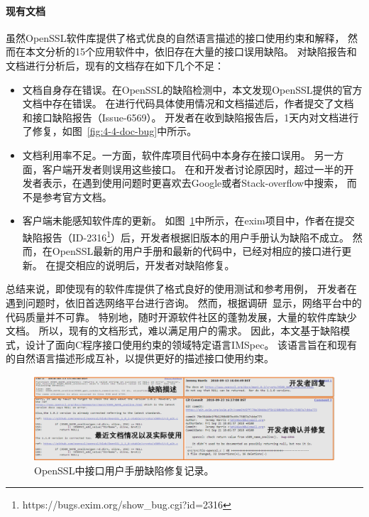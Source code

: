 \paragraph{现有文档}
虽然OpenSSL软件库提供了格式优良的自然语言描述的接口使用约束和解释，
然而在本文分析的15个应用软件中，依旧存在大量的接口误用缺陷。
对缺陷报告和文档进行分析后，现有的文档存在如下几个不足：
\begin{itemize}
	\item 文档自身存在错误。在OpenSSL的缺陷检测中，本文发现OpenSSL提供的官方文档中存在错误。
	在进行代码具体使用情况和文档描述后，作者提交了文档和接口缺陷报告（Issue-6569）。
	开发者在收到缺陷报告后，1天内对文档进行了修复，如图~\ref{fig:4-4-doc-bug}中所示。
	\item 文档利用率不足。一方面，软件库项目代码中本身存在接口误用。
	另一方面，客户端开发者则误用这些接口。
	在和开发者讨论原因时，超过一半的开发者表示，在遇到使用问题时更喜欢去Google或者Stack-overflow中搜索，
	而不是参考官方文档。
	\item 客户端未能感知软件库的更新。
	如图~\ref{fig:4-4-exim-bug}中所示，在exim项目中，作者在提交缺陷报告（ID-2316\footnote{https://bugs.exim.org/show\_bug.cgi?id=2316}）后，开发者根据旧版本的用户手册认为缺陷不成立。
	然而，在OpenSSL最新的用户手册和最新的代码中，已经对相应的接口进行更新。
	在提交相应的说明后，开发者对缺陷修复。
\end{itemize}

总结来说，即使现有的软件库提供了格式良好的使用测试和参考用例，
开发者在遇到问题时，依旧首选网络平台进行咨询。
然而，根据调研~\cite{18-icse-stack}显示，网络平台中的代码质量并不可靠。
特别地，随时开源软件社区的蓬勃发展，大量的软件库缺少文档。
所以，现有的文档形式，难以满足用户的需求。
因此，本文基于缺陷模式，设计了面向C程序接口使用约束的领域特定语言IMSpec。
该语言旨在和现有的自然语言描述形成互补，以提供更好的描述接口使用约束。

\begin{figure}[t]
	\centering
	\includegraphics[width=0\linewidth]{figures/cp4-exim-bug.png}
	\caption{
		OpenSSL中接口用户手册缺陷修复记录。
	}
	\label{fig:4-4-exim-bug}
\end{figure}

